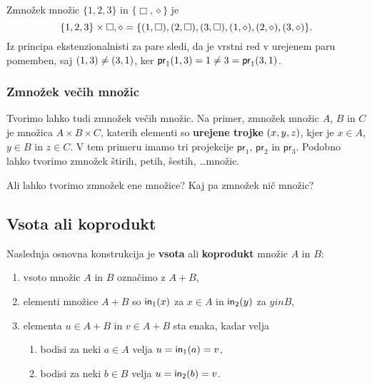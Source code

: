 \begin{primer}
Zmnožek množic $\{1,2,3\}$ in $\{\Box, \diamond\}$ je
%
\begin{equation*}
    \{1, 2, 3\} \times {\Box, \diamond} =
    \{(1, \Box),
      (2, \Box),
      (3, \Box),
      (1, \diamond),
      (2, \diamond),
      (3, \diamond)
     \}.
\end{equation*}
%
Iz principa ekstenzionalnisti za pare sledi, da je vrstni red v urejenem paru pomemben, saj $(1, 3) \neq (3, 1)$, ker $\mathsf{pr}_1(1,3) = 1 \neq 3 = \mathsf{pr}_1(3,1)$.
\end{primer}


\subsubsection{Zmnožek večih množic}

Tvorimo lahko tudi zmnožek večih množic. Na primer, zmnožek množic $A$, $B$ in $C$ je množica $A \times B \times C$, katerih elementi so \textbf{urejene trojke} $(x, y, z)$, kjer je $x \in A$, $y \in B$ in $z \in C$. V tem primeru imamo tri projekcije $\mathsf{pr}_1$, $\mathsf{pr}_2$ in $\mathsf{pr}_3$. Podobno lahko tvorimo zmnožek štirih, petih, šestih, \dots množic.

\begin{naloga}
  Ali lahko tvorimo zmnožek ene množice? Kaj pa zmnožek nič množic?
\end{naloga}


\subsection{Vsota ali koprodukt}

Naslednja osnovna konstrukcija je \textbf{vsota} ali \textbf{koprodukt} množic $A$ in $B$:
%
\begin{enumerate}
\item vsoto množic $A$ in $B$ označimo z $A + B$,
\item elementi množice $A + B$ so $\mathsf{in}_1(x)$ za $x \in A$ in $\mathsf{in}_2(y)$ za $y in B$,
\item elementa $u \in A + B$ in $v \in A + B$ sta enaka, kadar velja
  \begin{enumerate}
    \item bodisi za neki $a \in A$ velja $u = \mathsf{in}_1(a) = v$,
    \item bodisi za neki $b \in B$ velja $u = \mathsf{in}_2(b) = v$.
  \end{enumerate}
\end{enumerate}

